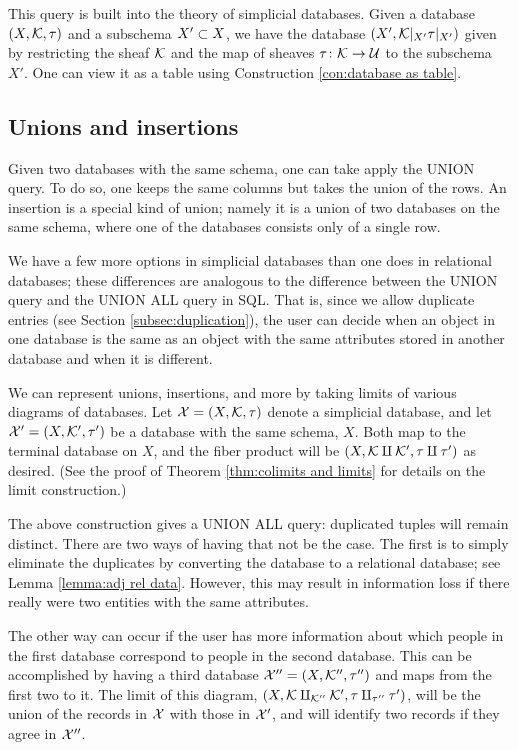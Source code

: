 \documentclass{amsart}
\begin{document}
This query is built into the theory of simplicial databases.  Given a database $(X,\mcK,\tau)$ and a subschema $X'\ss X$, we have the database $(X',\mcK|_{X'}\tau|_{X'})$ given by restricting the sheaf $\mcK$ and the map of sheaves $\tau\taking\mcK\to\mcU$ to the subschema $X'$.  One can view it as a table using Construction \ref{con:database as table}.

\subsection{Unions and insertions}

Given two databases with the same schema, one can take apply the UNION query.  To do so, one keeps the same columns but takes the union of the rows.  An insertion is a special kind of union; namely it is a union of two databases on the same schema, where one of the databases consists only of a single row.

We have a few more options in simplicial databases than one does in relational databases; these differences are analogous to the difference between the UNION query and the UNION ALL query in SQL.  That is, since we allow duplicate entries (see Section \ref{subsec:duplication}), the user can decide when an object in one database is the same as an object with the same attributes stored in another database and when it is different.  

We can represent unions, insertions, and more by taking limits of various diagrams of databases.  Let $\mcX=(X,\mcK,\tau)$ denote a simplicial database, and let $\mcX'=(X,\mcK',\tau')$ be a database with the same schema, $X$.  Both map to the terminal database on $X$, and the fiber product will be $(X,\mcK\amalg\mcK',\tau\amalg\tau')$ as desired.  (See the proof of Theorem \ref{thm:colimits and limits} for details on the limit construction.)

The above construction gives a UNION ALL query: duplicated tuples will remain distinct.  There are two ways of having that not be the case.  The first is to simply eliminate the duplicates by converting the database to a relational database; see Lemma \ref{lemma:adj rel data}.  However, this may result in information loss if there really were two entities with the same attributes.

The other way can occur if the user has more information about which people in the first database correspond to people in the second database.  This can be accomplished by having a third database $\mcX''=(X,\mcK'',\tau'')$ and maps from the first two to it.  The limit of this diagram, $(X,\mcK\amalg_{\mcK''}\mcK',\tau\amalg_{\tau''}\tau')$, will be the union of the records in $\mcX$ with those in $\mcX'$, and will identify two records if they agree in $\mcX''$.
\end{document}

